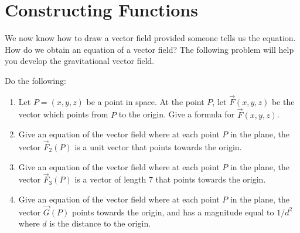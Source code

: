 \section{Constructing Functions}
We now know how to draw a vector field provided someone tells us the equation. How do we obtain an equation of a vector field? The following problem will help you develop the gravitational vector field.

\begin{problem}
%
%
Do the following:
\begin{enumerate}
 \item Let $P=(x,y,z)$ be a point in space.  At the point $P$, let $\vec F(x,y,z)$ be the vector which points from $P$ to the origin.  Give a formula for $\vec F(x,y,z)$.
 \item Give an equation of the vector field where at each point $P$ in the plane, the vector $\vec F_2(P)$ is a unit vector that points towards the origin.
 \item Give an equation of the vector field where at each point $P$ in the plane, the vector $\vec F_3(P)$ is a vector of length 7 that points towards the origin.
 \item Give an equation of the vector field where at each point $P$ in the plane, the vector $\vec G(P)$ points towards the origin, and has a magnitude equal to $1/d^2$ where $d$ is the distance to the origin.
\end{enumerate}
\end{problem}

